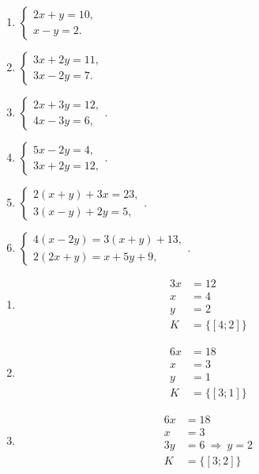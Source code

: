 \documentclass[11pt,a4paper]{article}
\begin{document}
\begin{zadaniReseniBox}[title={Domácí úkol}]
\begin{enumerate}[label=\alph*)]
\item
$\begin{cases}2x+y=10,\\x-y=2.\end{cases}$
\item
$\begin{cases}3x+2y=11,\\3x-2y=7.\end{cases}$
\item
$\begin{cases}2x+3y=12,\\4x-3y=6,\end{cases}$.
\item
$\begin{cases}5x-2y=4,\\3x+2y=12,\end{cases}$.
\item
$\begin{cases}2(x+y)+3x=23,\\3(x-y)+2y=5,\end{cases}$.
\item
$\begin{cases}4(x-2y)=3(x+y)+13,\\2(2x+y)=x+5y+9,\end{cases}$.
\end{enumerate}
\tcblower
\begin{enumerate}[label=\alph*)]
\item
\[
\begin{aligned}
3x&=12 \\
 x&=4 \\
 y&=2 \\[2mm]
K &= \{[4;2]\}
\end{aligned}
\]
\item
\[
\begin{aligned}
6x&=18 \\
 x&=3 \\
 y&=1 \\[2mm]
K &= \{[3;1]\}
\end{aligned}
\]
\item
\[
\begin{aligned}
6x&=18\\x&=3\\3y&=6\ \Rightarrow\ y=2 \\[2mm]
K &= \{[3;2]\}
\end{aligned}
\]
\end{enumerate}
\end{zadaniReseniBox}
\end{document}
